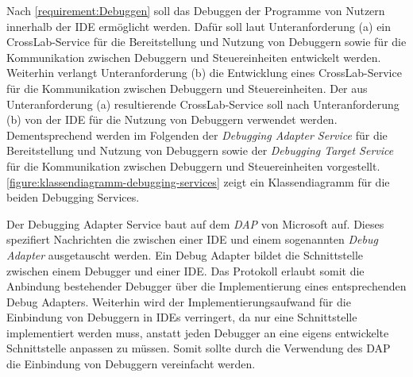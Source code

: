 Nach \autoref{requirement:Debuggen} soll das Debuggen der Programme von Nutzern innerhalb der IDE ermöglicht werden. Dafür soll laut Unteranforderung (a) ein CrossLab-Service für die Bereitstellung und Nutzung von Debuggern sowie für die Kommunikation zwischen Debuggern und Steuereinheiten entwickelt werden. Weiterhin verlangt Unteranforderung (b) die Entwicklung eines CrossLab-Service für die Kommunikation zwischen Debuggern und Steuereinheiten. Der aus Unteranforderung (a) resultierende CrossLab-Service soll nach Unteranforderung (b) von der IDE für die Nutzung von Debuggern verwendet werden. Dementsprechend werden im Folgenden der \textit{Debugging Adapter Service} für die Bereitstellung und Nutzung von Debuggern sowie der \textit{Debugging Target Service} für die Kommunikation zwischen Debuggern und Steuereinheiten vorgestellt. \autoref{figure:klassendiagramm-debugging-services} zeigt ein Klassendiagramm für die beiden Debugging Services.

Der Debugging Adapter Service baut auf dem \textit{\ac{DAP}} \cite{noauthor_debug-adapter-protocol_nodate} von Microsoft auf. Dieses spezifiert Nachrichten die zwischen einer IDE und einem sogenannten \textit{Debug Adapter} ausgetauscht werden. Ein Debug Adapter bildet die Schnittstelle zwischen einem Debugger und einer IDE. Das Protokoll erlaubt somit die Anbindung bestehender Debugger über die Implementierung eines entsprechenden Debug Adapters. Weiterhin wird der Implementierungsaufwand für die Einbindung von Debuggern in IDEs verringert, da nur eine Schnittstelle implementiert werden muss, anstatt jeden Debugger an eine eigens entwickelte Schnittstelle anpassen zu müssen. Somit sollte durch die Verwendung des \ac{DAP} die Einbindung von Debuggern vereinfacht werden.

